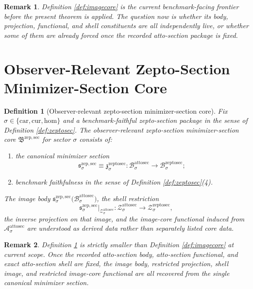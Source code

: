 \documentclass[11pt]{article}
\newcommand{\Car}{\mathrm{car}}
\newcommand{\Cur}{\mathrm{cur}}
\newcommand{\Hom}{\mathrm{hom}}
\newcommand{\AttoSectionBody}[1]{\mathcal B_{#1}^{\mathrm{attosec}}}
\newcommand{\AttoSectionFunctional}[1]{\mathscr A_{#1}^{\mathrm{attosec}}}
\newcommand{\AttoSectionShell}[1]{\mathcal Z_{#1}^{\mathrm{attosec}}}
\newcommand{\ZeptoSectionBody}[1]{\mathcal B_{#1}^{\mathrm{zeptosec}}}
\newcommand{\ZeptoSectionAttoMin}[1]{\mathfrak z_{#1}^{\mathrm{zeptosec}}}
\newcommand{\ZeptoSectionShell}[1]{\mathcal Z_{#1}^{\mathrm{zeptosec}}}
\newcommand{\ZeptoMinSectionCore}{\mathfrak B^{\mathrm{zep,sec}}}
\newcommand{\ZeptoMinSection}[1]{\mathfrak s_{#1}^{\mathrm{zep,sec}}}
\newtheorem{definition}{Definition}
\newtheorem{remark}{Remark}
\begin{document}
\begin{remark}
Definition \ref{def:imagecore} is the current benchmark-facing frontier before the present theorem is applied. The question now is whether its body, projection, functional, and shell constituents are all independently live, or whether some of them are already forced once the recorded atto-section package is fixed.
\end{remark}

\section{Observer-Relevant Zepto-Section Minimizer-Section Core}

\begin{definition}[Observer-relevant zepto-section minimizer-section core]
\label{def:sectioncore}
Fix \(\sigma\in\{\Car,\Cur,\Hom\}\) and a benchmark-faithful zepto-section package in the sense of Definition \ref{def:zeptosec}. The \emph{observer-relevant zepto-section minimizer-section core} \(\ZeptoMinSectionCore\) for sector \(\sigma\) consists of:
\begin{enumerate}
    \item the canonical minimizer section
    \[
    \ZeptoMinSection{\sigma}
    \equiv
    \ZeptoSectionAttoMin{\sigma}
    :
    \AttoSectionBody{\sigma}\to\ZeptoSectionBody{\sigma};
    \]
    \item benchmark faithfulness in the sense of Definition \ref{def:zeptosec}(4).
\end{enumerate}
The image body \(\ZeptoMinSection{\sigma}\bigl(\AttoSectionBody{\sigma}\bigr)\), the shell restriction
\[
\ZeptoMinSection{\sigma}\big|_{\AttoSectionShell{\sigma}}
:
\AttoSectionShell{\sigma}\to\ZeptoSectionShell{\sigma},
\]
the inverse projection on that image, and the image-core functional induced from \(\AttoSectionFunctional{\sigma}\) are understood as derived data rather than separately listed core data.
\end{definition}

\begin{remark}
Definition \ref{def:sectioncore} is strictly smaller than Definition \ref{def:imagecore} at current scope. Once the recorded atto-section body, atto-section functional, and exact atto-section shell are fixed, the image body, restricted projection, shell image, and restricted image-core functional are all recovered from the single canonical minimizer section.
\end{remark}
\end{document}

